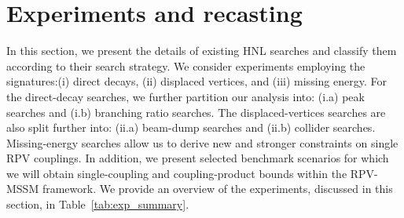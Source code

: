 \section{Experiments and recasting}\label{sec:exp}
In this section, we present the details of existing HNL searches and classify them according to their search 
strategy. We consider experiments employing the signatures:(i) direct decays, (ii) displaced vertices, and (iii) 
missing energy. For the direct-decay searches, we further partition our analysis into: (i.a) peak searches and (i.b) 
branching ratio searches. The displaced-vertices searches are also split further into: (ii.a) beam-dump searches 
and (ii.b) collider searches.
Missing-energy searches allow us to derive new and stronger constraints on single RPV couplings. In addition, we present 
selected benchmark scenarios for which we will obtain single-coupling and coupling-product bounds within the RPV-MSSM 
framework. We provide an  overview of the experiments, discussed in this section, in Table~\ref{tab:exp_summary}.


